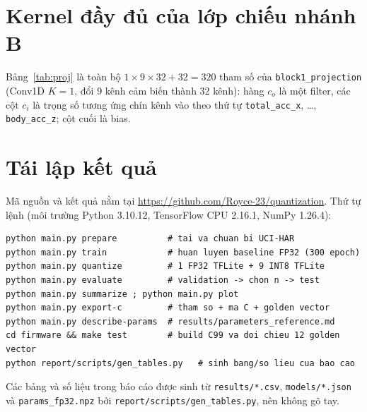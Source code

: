 \documentclass[12pt,a4paper]{article}
\newcommand{\code}[1]{\texttt{#1}}
\begin{document}
\section{Kernel đầy đủ của lớp chiếu nhánh B}\label{app:proj}
Bảng~\ref{tab:proj} là toàn bộ $1\times9\times32+32=320$ tham số của \code{block1\_projection} (Conv1D $K=1$, đổi 9 kênh cảm biến thành 32 kênh): hàng $c_o$ là một filter, các cột $c_i$ là trọng số tương ứng chín kênh vào theo thứ tự \code{total\_acc\_x}, \dots, \code{body\_acc\_z}; cột cuối là bias.

\begin{table}[h]
\centering\scriptsize
{}
\caption{Kernel $W_{0,c_i,c_o}$ và bias của \code{block1\_projection}.}
\label{tab:proj}
\end{table}

\section{Tái lập kết quả}
Mã nguồn và kết quả nằm tại \url{https://github.com/Royce-23/quantization}. Thứ tự lệnh (môi trường Python 3.10.12, TensorFlow CPU 2.16.1, NumPy 1.26.4):
\begin{lstlisting}[style=cstyle,numbers=none]
python main.py prepare          # tai va chuan bi UCI-HAR
python main.py train            # huan luyen baseline FP32 (300 epoch)
python main.py quantize         # 1 FP32 TFLite + 9 INT8 TFLite
python main.py evaluate         # validation -> chon n -> test
python main.py summarize ; python main.py plot
python main.py export-c         # tham so + ma C + golden vector
python main.py describe-params  # results/parameters_reference.md
cd firmware && make test        # build C99 va doi chieu 12 golden vector
python report/scripts/gen_tables.py   # sinh bang/so lieu cua bao cao
\end{lstlisting}
Các bảng và số liệu trong báo cáo được sinh từ \code{results/*.csv}, \code{models/*.json} và \code{params\_fp32.npz} bởi \code{report/scripts/gen\_tables.py}, nên không gõ tay.
\end{document}
